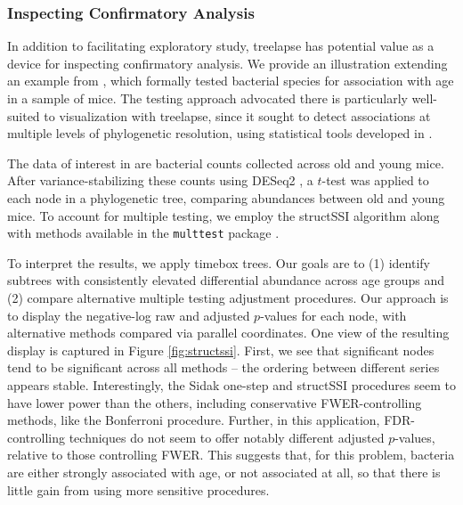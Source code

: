 \subsubsection{Inspecting Confirmatory Analysis}\label{structssi}

In addition to facilitating exploratory study, treelapse has potential
value as a device for inspecting confirmatory analysis. We provide an
illustration extending an example from \citep{callahan2016bioconductor}, which
formally tested bacterial species for association with age in a sample of mice.
The testing approach advocated there is particularly well-suited to
visualization with treelapse, since it sought to detect associations at multiple
levels of phylogenetic resolution, using statistical tools developed in
\citep{yekutieli2008hierarchical, sankaran2014structssi}.

The data of interest in \citep{callahan2016bioconductor} are bacterial counts
collected across old and young mice. After variance-stabilizing these counts
using DESeq2 \citep{love2014moderated}, a $t$-test was applied to each node in a
phylogenetic tree, comparing abundances between old and young mice. To account
for multiple testing, we employ the structSSI algorithm
\citep{yekutieli2008hierarchical, sankaran2014structssi} along with methods
available in the \texttt{multtest} package \citep{pollard2005multiple}.

To interpret the results, we apply timebox trees. Our goals are to (1) identify
subtrees with consistently elevated differential abundance across age groups and
(2) compare alternative multiple testing adjustment procedures. Our approach is
to display the negative-log raw and adjusted $p$-values for each node, with
alternative methods compared via parallel coordinates. One view of the resulting
display is captured in Figure \ref{fig:structssi}. First, we see that
significant nodes tend to be significant across all methods -- the ordering
between different series appears stable. Interestingly, the Sidak one-step and
structSSI procedures seem to have lower power than the others, including
conservative FWER-controlling methods, like the Bonferroni procedure. Further,
in this application, FDR-controlling techniques do not seem to offer notably
different adjusted $p$-values, relative to those controlling FWER. This suggests
that, for this problem, bacteria are either strongly associated with age, or not
associated at all, so that there is little gain from using more sensitive
procedures.


